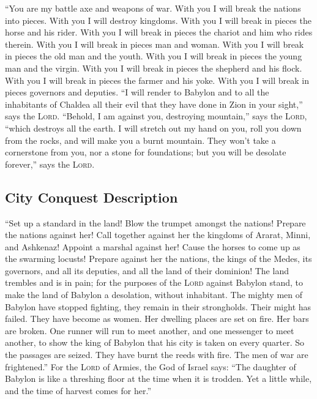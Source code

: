  ``You are my battle axe and weapons of war. With you I
will break the nations into pieces. With you I will destroy kingdoms.
 With you I will break in pieces the horse and his rider.
 With you I will break in pieces the chariot and him who
rides therein. With you I will break in pieces man and woman. With you I
will break in pieces the old man and the youth. With you I will break in
pieces the young man and the virgin.  With you I will
break in pieces the shepherd and his flock. With you I will break in
pieces the farmer and his yoke. With you I will break in pieces
governors and deputies.  ``I will render to Babylon and
to all the inhabitants of Chaldea all their evil that they have done in
Zion in your sight,'' says the \textsc{Lord}.  ``Behold,
I am against you, destroying mountain,'' says the \textsc{Lord}, ``which
destroys all the earth. I will stretch out my hand on you, roll you down
from the rocks, and will make you a burnt mountain.  They
won't take a cornerstone from you, nor a stone for foundations; but you
will be desolate forever,'' says the \textsc{Lord}.

\hypertarget{city-conquest-description}{%
\subsection{City Conquest Description}\label{city-conquest-description}}

 ``Set up a standard in the land! Blow the trumpet
amongst the nations! Prepare the nations against her! Call together
against her the kingdoms of Ararat, Minni, and Ashkenaz! Appoint a
marshal against her! Cause the horses to come up as the swarming
locusts!  Prepare against her the nations, the kings of
the Medes, its governors, and all its deputies, and all the land of
their dominion!  The land trembles and is in pain; for
the purposes of the \textsc{Lord} against Babylon stand, to make the
land of Babylon a desolation, without inhabitant.  The
mighty men of Babylon have stopped fighting, they remain in their
strongholds. Their might has failed. They have become as women. Her
dwelling places are set on fire. Her bars are broken. 
One runner will run to meet another, and one messenger to meet another,
to show the king of Babylon that his city is taken on every quarter.
 So the passages are seized. They have burnt the reeds
with fire. The men of war are frightened.''  For the
\textsc{Lord} of Armies, the God of Israel says: ``The daughter of
Babylon is like a threshing floor at the time when it is trodden. Yet a
little while, and the time of harvest comes for her.''

